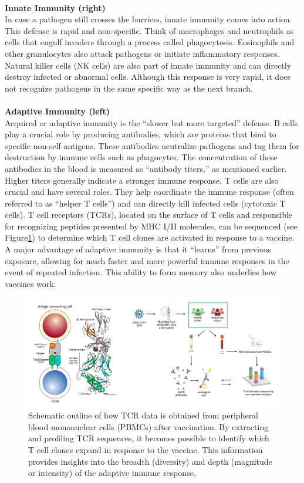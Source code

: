 \documentclass[12pt,a4paper]{report}
\begin{document}
\\
\textbf{Innate Immunity (right)}\\
In case a pathogen still crosses the barriers, innate immunity comes into action. This defense is rapid and non-specific. Think of macrophages and neutrophils as cells that engulf invaders through a process called phagocytosis. Eosinophils and other granulocytes also attack pathogens or initiate inflammatory responses. Natural killer cells (NK cells) are also part of innate immunity and can directly destroy infected or abnormal cells. Although this response is very rapid, it does not recognize pathogens in the same specific way as the next branch. \cite{janeway2001immunobiology}\\
\\
\textbf{Adaptive Immunity (left)}\\
Acquired or adaptive immunity is the “slower but more targeted” defense. B cells play a crucial role by producing antibodies, which are proteins that bind to specific non-self antigens. These antibodies neutralize pathogens and tag them for destruction by immune cells such as phagocytes.
The concentration of these antibodies in the blood is measured as “antibody titers,” as mentioned earlier. Higher titers generally indicate a stronger immune response. T cells are also crucial and have several roles. They help coordinate the immune response (often referred to as “helper T cells”) and can directly kill infected cells (cytotoxic T cells). T cell receptors (TCRs), located on the surface of T cells and responsible for recognizing peptides presented by MHC I/II molecules, can be sequenced (see Figure\ref{fig:TCR_profiling}) to determine which T cell clones are activated in response to a vaccine. A major advantage of adaptive immunity is that it “learns” from previous exposure, allowing for much faster and more powerful immune responses in the event of repeated infection. This ability to form memory also underlies how vaccines work. \cite{janeway2001immunobiology}

\begin{figure}[h]
  \centering
  \includegraphics[width=1\textwidth]{images/TCR_profiling.png}
  \caption[ TCR sequencing Workflow]{Schematic outline of how TCR data is obtained from peripheral blood mononuclear cells (PBMCs) after vaccination. By extracting and profiling TCR sequences, it becomes possible to identify which T cell clones expand in response to the vaccine. This information provides insights into the breadth (diversity) and depth (magnitude or intensity) of the adaptive immune response.}
  \label{fig:TCR_profiling}
\end{figure}
\end{document}
